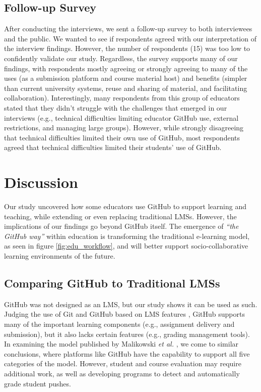 \subsection{Follow-up Survey}
After conducting the interviews, we sent a follow-up survey to both interviewees and the public. We wanted to see if respondents agreed with our interpretation of the interview findings. However, the number of respondents (15) was too low to confidently validate our study. Regardless, the survey supports many of our findings, with respondents mostly agreeing or strongly agreeing to many of the uses (as a submission platform and course material host) and benefits (simpler than current university systems, reuse and sharing of material, and facilitating collaboration). Interestingly, many respondents from this group of educators stated that they didn't struggle with the challenges that emerged in our interviews (e.g., technical difficulties limiting educator GitHub use, external restrictions, and managing large groups). However, while strongly disagreeing that technical difficulties limited their own use of GitHub, most respondents agreed that technical difficulties limited their students' use of GitHub.

\section{Discussion}
Our study uncovered how some educators use GitHub to support learning and teaching, while extending or even replacing traditional LMSs. However, the implications of our findings go beyond GitHub itself. The emergence of \textit{``the GitHub way''} within education is transforming the traditional e-learning model, as seen in figure \ref{fig:edu_workflow}, and will better support socio-collaborative learning environments \cite{kreijns2002sociability} of the future.

\subsection{Comparing GitHub to Traditional LMSs}
GitHub was not designed as an LMS, but our study shows it can be used as such. Judging the use of Git and GitHub based on LMS features \cite{kumar2011comparative}, GitHub supports many of the important learning components (e.g., assignment delivery and submission), but it also lacks certain features (e.g., grading management tools). In examining the model published by Malikowski \textit{et al.} \cite{malikowski2007model}, we come to similar conclusions, where platforms like GitHub have the capability to support all five categories of the model. However, student and course evaluation may require additional work, as well as developing programs to detect and automatically grade student pushes.


